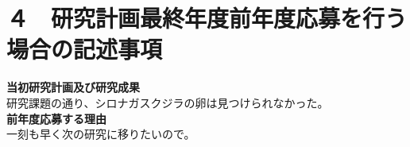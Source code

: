 \documentclass[11pt,a4j,dvipdfmx]{jarticle} 					%
\newcommand{\研究課題名}{象の卵}
\newcommand{\研究機関名}{逢坂大学}
\newcommand{\研究代表者氏名}{湯川秀樹}
\newcommand{\研究期間の最終元号年度}{11}  %
\begin{document}



\section{４　研究計画最終年度前年度応募を行う場合の記述事項}

\newcommand{\最終年度研究種目名}{基盤研究（Z）}
\newcommand{\最終年度研究課題番号}{99999}
\newcommand{\最終年度研究課題名}{シロナガスクジラの卵はなぜ見つけられないのか}
\newcommand{\最終年度研究期間}{令和？？年度〜令和\一年目 年度}


\noindent
\textbf{当初研究計画及び研究成果}\\
	研究課題の通り、シロナガスクジラの卵は見つけられなかった。
\\

\noindent
\textbf{前年度応募する理由}\\
	一刻も早く次の研究に移りたいので。



\end{document}
